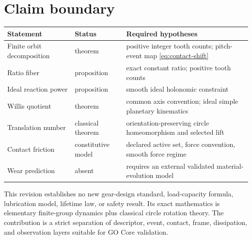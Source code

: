\documentclass[11pt,a4paper]{article}
\theoremstyle{definition}
\theoremstyle{plain}
\theoremstyle{remark}
\begin{document}
\section{Claim boundary}

\begin{center}
\begin{tabularx}{\linewidth}{L{42mm}L{28mm}Y}
\toprule
Statement & Status & Required hypotheses\\
\midrule
Finite orbit decomposition & theorem &
positive integer tooth counts; pitch-event map
\cref{eq:contact-shift}\\
Ratio fiber & proposition &
exact constant ratio; positive tooth counts\\
Ideal reaction power & proposition &
smooth ideal holonomic constraint\\
Willis quotient & theorem &
common axis convention; ideal simple planetary kinematics\\
Translation number & classical theorem &
orientation-preserving circle homeomorphism and selected lift\\
Contact friction & constitutive model &
declared active set, force convention, smooth force regime\\
Wear prediction & absent &
requires an external validated material-evolution model\\
\bottomrule
\end{tabularx}
\end{center}

This revision establishes no new gear-design standard, load-capacity
formula, lubrication model, lifetime law, or safety result. Its exact
mathematics is elementary finite-group dynamics plus classical circle
rotation theory. The contribution is a strict separation of
descriptor, event, contact, frame, dissipation, and observation
layers suitable for GO Core validation.
\end{document}
